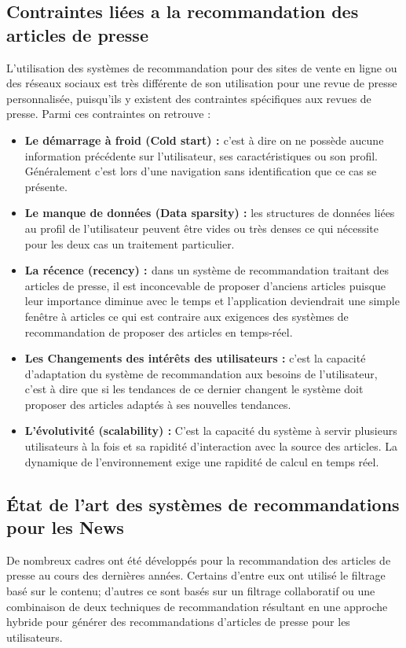     \subsection*{Contraintes liées a la recommandation des articles de presse}
    L'utilisation des systèmes de recommandation pour des sites de vente en ligne ou des réseaux sociaux est très différente de son utilisation pour une revue de presse personnalisée, puisqu'ils y existent des contraintes spécifiques aux revues de presse.
    Parmi ces contraintes on retrouve :
    \begin{itemize}
        \item \textbf{Le démarrage à froid (Cold start) : \label{froid}}c'est à dire on ne possède aucune information précédente sur l'utilisateur, ses caractéristiques ou son profil. Généralement c'est lors d'une navigation sans identification que ce cas se présente.\\
        \item \textbf{Le manque de données (Data sparsity) : }les structures de données liées au profil de l'utilisateur peuvent être vides ou très denses ce qui nécessite pour les deux cas un traitement particulier.\\
        \item \textbf{La récence (recency) : \label{recence}}dans un système de recommandation traitant des articles de presse, il est inconcevable de proposer d'anciens articles puisque leur importance diminue avec le temps et l'application deviendrait une simple fenêtre à articles ce qui est contraire aux exigences des systèmes de recommandation de proposer des articles en temps-réel.\\
        \item \textbf{Les Changements des intérêts des utilisateurs : }c'est la capacité d'adaptation du système de recommandation aux besoins de l'utilisateur, c'est à dire que si les tendances de ce dernier changent le système doit proposer des articles adaptés à ses nouvelles tendances.\\
        \item \textbf{L'évolutivité (scalability) : }C'est la capacité du système à servir plusieurs utilisateurs à la fois et sa rapidité d'interaction avec la source des articles. La dynamique de l'environnement exige une rapidité de calcul en temps réel.\\ 
    \end{itemize}

    \subsection{État de l'art des systèmes de recommandations pour les News}
    De nombreux cadres ont été développés pour la recommandation des articles de presse au cours des dernières années. Certains d'entre eux ont utilisé le filtrage basé sur le contenu; d'autres ce sont basés sur un filtrage collaboratif ou une combinaison de deux techniques de recommandation résultant en une approche hybride pour générer des recommandations d'articles de presse pour les utilisateurs.\\


